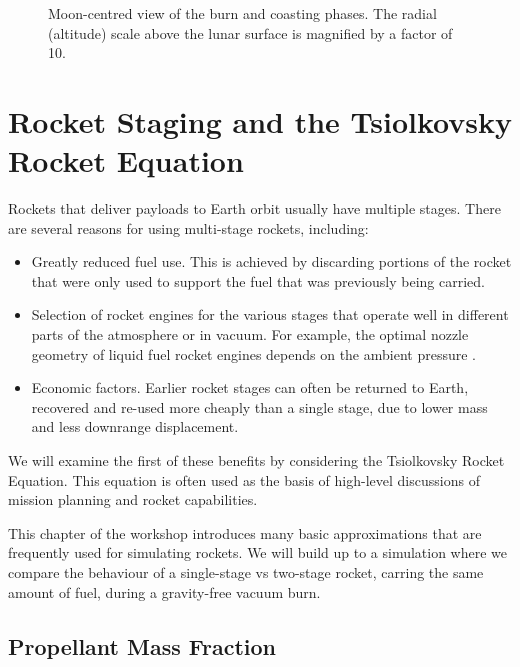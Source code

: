 \documentclass[12pt,openany]{book}
\begin{document}
\begin{figure}[htbp]
  \centering
  \resizebox{0.5\textwidth}{!}{}
  \caption{Moon-centred view of the burn and coasting phases. The radial (altitude) scale above the lunar surface is magnified by a factor of 10.}
  \label{fig:lunar-ascent-moon-view}
\end{figure}

\chapter{Rocket Staging and the Tsiolkovsky Rocket Equation}

Rockets that deliver payloads to Earth orbit usually have multiple stages. There are several reasons for using multi-stage rockets, including:

\begin{itemize}
\item Greatly reduced fuel use. This is achieved by discarding portions of the rocket that were only used to support the fuel that was previously being carried.
\item Selection of rocket engines for the various stages that operate well in different parts of the atmosphere or in vacuum. For example, the optimal nozzle geometry of liquid fuel rocket engines depends on the ambient pressure \cite{marble1964,huzel1967}.
\item Economic factors. Earlier rocket stages can often be returned to Earth, recovered and re-used more cheaply than a single stage, due to lower mass and less downrange displacement.
\end{itemize}

We will examine the first of these benefits by considering the Tsiolkovsky Rocket Equation. This equation is often used as the basis of high-level discussions of mission planning and rocket capabilities.

This chapter of the workshop introduces many basic approximations that are frequently used for simulating rockets. We will build up to a simulation where we compare the behaviour of a single-stage vs two-stage rocket, carring the same amount of fuel, during a gravity-free vacuum burn.

\section{Propellant Mass Fraction}
\end{document}
